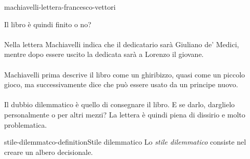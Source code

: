 \documentclass[preview]{standalone}
\begin{document}
\begin{snippet}{machiavelli-lettera-francesco-vettori}
\begin{enumerate}
    \end{enumerate}
    Il libro è quindi finito o no?
    \\\\
    Nella lettera Machiavelli indica che il dedicatario sarà Giuliano de' Medici,
    mentre dopo essere uscito la dedicata sarà a Lorenzo il giovane. %
    \\\\
    Machiavelli prima descrive il libro come un ghiribizzo, quasi come un piccolo gioco,
    ma successivamente dice che può essere usato da un principe nuovo.
    \\\\
    Il dubbio dilemmatico è quello di consegnare il libro.
    E se darlo, darglielo personalmente o per altri mezzi?
    La lettera è quindi piena di dissirio e molto problematica.
\end{snippet}

\begin{snippetdefinition}{stile-dilemmatco-definition}{Stile dilemmatico}
    Lo \textit{stile dilemmatico} consiste nel creare un albero decisionale.
\end{snippetdefinition}
\end{document}

